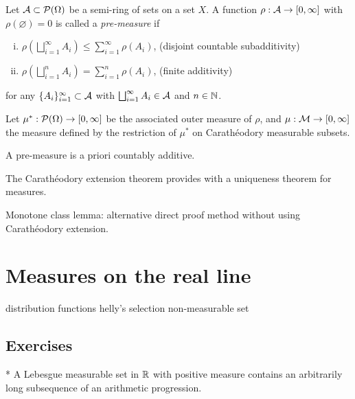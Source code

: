 \documentclass{../note}
\begin{document}
\begin{prb}
Let $\mathcal{A}\subset\mathcal{P}(\Omega)$ be a semi-ring of sets on a set $X$.
A function $\rho:\mathcal{A}\to[0,\infty]$ with $\rho(\varnothing)=0$ is called a \emph{pre-measure} if
\begin{enumerate}[(i)]
\item $\rho(\bigsqcup_{i=1}^\infty A_i)\le\sum_{i=1}^\infty\rho(A_i)$,
\hfill(disjoint countable subadditivity)
\item $\rho(\bigsqcup_{i=1}^nA_i)=\sum_{i=1}^n\rho(A_i)$,
\hfill(finite additivity)
\end{enumerate}
for any $\{A_i\}_{i=1}^\infty\subset\mathcal{A}$ with $\bigsqcup_{i=1}^\infty A_i\in\mathcal{A}$ and $n\in\mathbb{N}$.

Let $\mu^*:\mathcal{P}(\Omega)\to[0,\infty]$ be the associated outer measure of $\rho$, and $\mu:\mathcal{M}\to[0,\infty]$ the measure defined by the restriction of $\mu^*$ on Carath\'eodory measurable subsets.
\begin{parts}
\item A pre-measure is a priori countably additive.
\end{parts}
\end{prb}



\begin{prb}
The Carath\'eodory extension theorem provides with a uniqueness theorem for measures.
\end{prb}



Monotone class lemma: alternative direct proof method without using Carath\'eodory extension.


\chapter{Measures on the real line}

distribution functions
helly's selection
non-measurable set


\section*{Exercises}
\begin{prb}*
A Lebesgue measurable set in $\mathbb{R}$ with positive measure contains an arbitrarily long subsequence of an arithmetic progression.
\end{prb}
\end{document}
